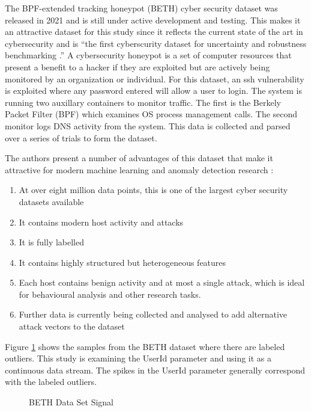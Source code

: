 The BPF-extended tracking honeypot (BETH) cyber security dataset was released in 2021 and is still under active development and testing. This makes it an attractive dataset for this study since it reflects the current state of the art in cybersecurity and is ``the first cyberscurity dataset for uncertainty and robustness benchmarking \cite{beth-dataset}.'' A cybersecurity honeypot is a set of computer resources that present a benefit to a hacker if they are exploited but are actively being monitored by an organization or individual. For this dataset, an ssh vulnerability is exploited where any password entered will allow a user to login. The system is running two auxillary containers to monitor traffic. The first is the Berkely Packet Filter (BPF) which examines OS process management calls. The second monitor logs DNS activity from the system. This data is collected and parsed over a series of trials to form the dataset.

The authors present a number of advantages of this dataset that make it attractive for modern machine learning and anomaly detection research \cite{beth-dataset}:

\begin{enumerate}
    \item At over eight million data points, this is one of the largest cyber security datasets available
    \item It contains modern host activity and attacks
    \item It is fully labelled
    \item It contains highly structured but heterogeneous features 
    \item Each host contains benign activity and at most a single attack, which is ideal for behavioural analysis and other research tasks.
    \item Further data is currently being collected and analysed to add alternative attack vectors to the dataset
\end{enumerate}

Figure \ref{fig:beth_userid_all} shows the samples from the BETH dataset where there are labeled outliers. This study is examining the UserId parameter and using it as a continuous data stream. The spikes in the UserId parameter generally correspond with the labeled outliers.
\begin{figure}[H]
    \centering
    
    \caption{BETH Data Set Signal}
    \label{fig:beth_userid_all}
\end{figure}



